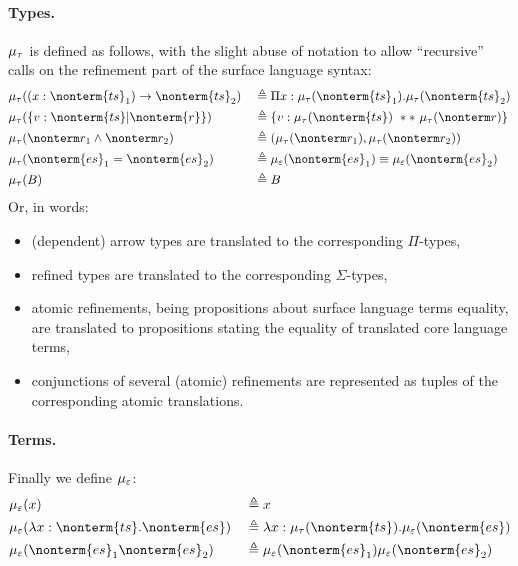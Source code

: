 \documentclass[a4paper]{article}
\begin{document}
\paragraph{Types.}
$\mu_\tau$ is defined as follows,
with the slight abuse of notation to allow ``recursive'' calls
on the refinement part of the surface language syntax:
\begin{equation}
\begin{aligned}
  & \tranty( (x : \nonterm{ts}_1) \rightarrow \nonterm{ts}_2)  && \triangleq \Pi x : \tranty(\nonterm{ts}_1). \tranty(\nonterm{ts}_2)     \\
  & \tranty( \{ v : \nonterm{ts} | \nonterm{r} \})             && \triangleq \{ v : \tranty(\nonterm{ts})\ **\ \tranty(\nonterm r) \}     \\
  & \tranty( \nonterm r_1 \land \nonterm r_2 )                 && \triangleq ( \tranty(\nonterm r_1) , \tranty(\nonterm r_2))             \\
  & \tranty( \nonterm{es}_1 = \nonterm{es}_2 )                 && \triangleq \tranterm(\nonterm{es}_1) \equiv \tranterm(\nonterm{es}_2)   \\
  & \tranty(B)                                                 && \triangleq B                                                            \\
\end{aligned}
\end{equation}
Or, in words:
\begin{itemize}
  \item (dependent) arrow types are translated to the corresponding $\Pi$-types,
  \item refined types are translated to the corresponding $\Sigma$-types,
  \item atomic refinements, being propositions about surface language terms equality,
    are translated to propositions stating the equality of translated core language terms,
  \item conjunctions of several (atomic) refinements are represented as tuples of the corresponding atomic translations.
\end{itemize}

\paragraph{Terms.}
Finally we define $\mu_\varepsilon$:
\begin{equation}
\begin{aligned}
  & \tranterm(x) &&
    \triangleq x                                                              \\
  & \tranterm(\lambda x : \nonterm{ts}. \nonterm{es})  &&
    \triangleq \lambda x : \tranty(\nonterm{ts}). \tranterm(\nonterm{es})     \\
  & \tranterm(\nonterm{es}_1 \nonterm{es}_2)  &&
    \triangleq \tranterm(\nonterm{es}_1) \tranterm(\nonterm{es}_2)            \\
\end{aligned}
\end{equation}
\end{document}
